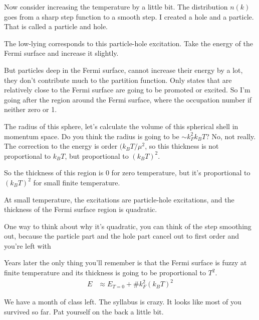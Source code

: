 Now consider increasing the temperature by a little bit.
The distribution $n(k)$ goes from a sharp step function
to a smooth step.
I created a hole and a particle.
That is called a particle and hole.

The low-lying corresponds to this particle-hole excitation.
Take the energy of the Fermi surface and increase it slightly.

But particles deep in the Fermi surface,
cannot increase their energy by a lot,
they don't contribute much to the partition function.
Only states that are relatively close to the Fermi surface are going to be
promoted or excited.
So I'm going after the region around the Fermi surface,
where the occupation number if neither zero or 1.

The radius of this sphere,
let's calculate the volume of this spherical shell in momentum space.
Do you think the radius is going to be $\sim k_F^2 k_B T$?
No,
not really.
The correction to the energy is order $(k_BT/\mu^2$,
so this thickness is not proportional to $k_BT$,
but proportional to $(k_B T)^2$.

So the thickness of this region is 0
for zero temperature,
but it's proportional to $(k_B T)^2$
for small finite temperature.

At small temperature,
the excitations are particle-hole excitations,
and the thickness of the Fermi surface region is quadratic.

One way to think about why it's quadratic,
you can think of the step smoothing out,
because the particle part and the hole part cancel out to first order
and you're left with

Years later the only thing you'll remember is that the Fermi surface is fuzzy at
finite temperature and its thickness is going to be proportional to $T^2$.
\begin{align}
    E &\approx
    E_{T=0}
    +
    \#
    k_F^2 (k_BT)^2
\end{align}

We have a month of class left.
The syllabus is crazy.
It looks like most of you survived so far.
Pat yourself on the back a little bit.
